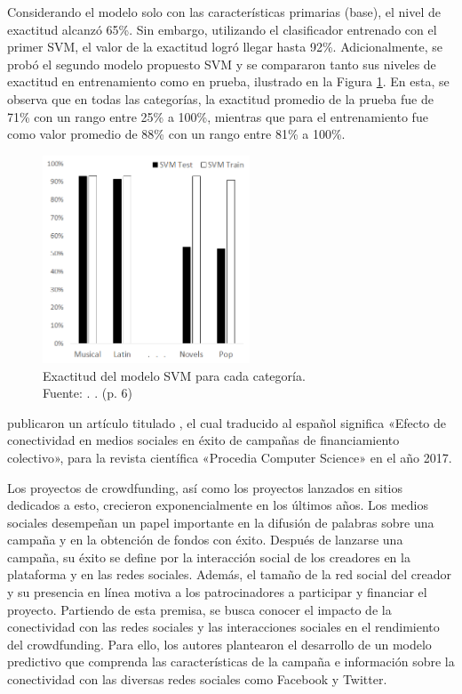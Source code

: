 Considerando el modelo solo con las características primarias (base), el nivel de exactitud alcanzó 65\%. Sin embargo, utilizando el clasificador entrenado con el primer SVM, el valor de la exactitud logró llegar hasta 92\%. Adicionalmente, se probó el segundo modelo propuesto SVM y se compararon tanto sus niveles de exactitud en entrenamiento como en prueba, ilustrado en la Figura \ref{2:fig119}. En esta, se observa que en todas las categorías, la exactitud promedio de la prueba fue de 71\% con un rango entre 25\% a 100\%, mientras que para el entrenamiento fue como valor promedio de 88\% con un rango entre 81\% a 100\%.

\begin{figure}[!ht]
	\begin{center}
		\includegraphics[width=0.55\textwidth]{2/figures/sawhney2016.png}
		\caption[Exactitud del modelo SVM para cada categoría]{Exactitud del modelo SVM para cada categoría.\\
			Fuente: \cite{pr_sawhney2016usingLT}. . (p. 6)}
		\label{2:fig119}
	\end{center}
\end{figure}

\newpage
\cite{pr_kaur2017socmedcrowd} publicaron un artículo titulado , el cual traducido al español significa «Efecto de conectividad en medios sociales en éxito de campañas de financiamiento colectivo», para la revista científica «Procedia Computer Science» en el año 2017.

Los proyectos de crowdfunding, así como los proyectos lanzados en sitios dedicados a esto, crecieron exponencialmente en los últimos años. Los medios sociales desempeñan un papel importante en la difusión de palabras sobre una campaña y en la obtención de fondos con éxito. Después de lanzarse una campaña, su éxito se define por la interacción social de los creadores en la plataforma y en las redes sociales. Además, el tamaño de la red social del creador y su presencia en línea motiva a los patrocinadores a participar y financiar el proyecto. Partiendo de esta premisa, se busca conocer el impacto de la conectividad con las redes sociales y las interacciones sociales en el rendimiento del crowdfunding. Para ello, los autores plantearon el desarrollo de un modelo predictivo que comprenda las características de la campaña e información sobre la conectividad con las diversas redes sociales como Facebook y Twitter.

